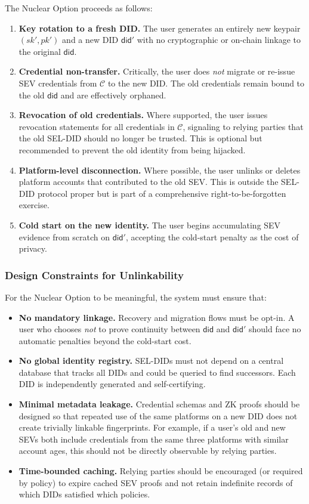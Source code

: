 \documentclass[11pt]{article}
\begin{document}
The Nuclear Option proceeds as follows:

\begin{enumerate}
  \item \textbf{Key rotation to a fresh DID.} The user generates an entirely new keypair $(sk', pk')$ and a new DID $\mathsf{did}'$ with no cryptographic or on-chain linkage to the original $\mathsf{did}$.
  \item \textbf{Credential non-transfer.} Critically, the user does \emph{not} migrate or re-issue SEV credentials from $\mathcal{C}$ to the new DID. The old credentials remain bound to the old $\mathsf{did}$ and are effectively orphaned.
  \item \textbf{Revocation of old credentials.} Where supported, the user issues revocation statements for all credentials in $\mathcal{C}$, signaling to relying parties that the old SEL-DID should no longer be trusted. This is optional but recommended to prevent the old identity from being hijacked.
  \item \textbf{Platform-level disconnection.} Where possible, the user unlinks or deletes platform accounts that contributed to the old SEV. This is outside the SEL-DID protocol proper but is part of a comprehensive right-to-be-forgotten exercise.
  \item \textbf{Cold start on the new identity.} The user begins accumulating SEV evidence from scratch on $\mathsf{did}'$, accepting the cold-start penalty as the cost of privacy.
\end{enumerate}

\subsubsection{Design Constraints for Unlinkability}

For the Nuclear Option to be meaningful, the system must ensure that:

\begin{itemize}
  \item \textbf{No mandatory linkage.} Recovery and migration flows must be opt-in. A user who chooses \emph{not} to prove continuity between $\mathsf{did}$ and $\mathsf{did}'$ should face no automatic penalties beyond the cold-start cost.
  \item \textbf{No global identity registry.} SEL-DIDs must not depend on a central database that tracks all DIDs and could be queried to find successors. Each DID is independently generated and self-certifying.
  \item \textbf{Minimal metadata leakage.} Credential schemas and ZK proofs should be designed so that repeated use of the same platforms on a new DID does not create trivially linkable fingerprints. For example, if a user's old and new SEVs both include credentials from the same three platforms with similar account ages, this should not be directly observable by relying parties.
  \item \textbf{Time-bounded caching.} Relying parties should be encouraged (or required by policy) to expire cached SEV proofs and not retain indefinite records of which DIDs satisfied which policies.
\end{itemize}
\end{document}
